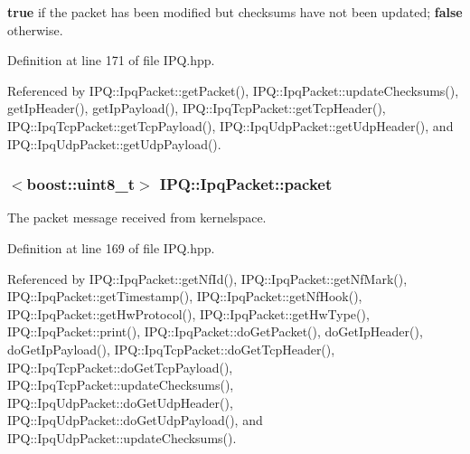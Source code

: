 {\bfseries true} if the packet has been modified but checksums have not been updated; {\bfseries false} otherwise. 



\-Definition at line 171 of file \-I\-P\-Q.\-hpp.



\-Referenced by \-I\-P\-Q\-::\-Ipq\-Packet\-::get\-Packet(), \-I\-P\-Q\-::\-Ipq\-Packet\-::update\-Checksums(), get\-Ip\-Header(), get\-Ip\-Payload(), \-I\-P\-Q\-::\-Ipq\-Tcp\-Packet\-::get\-Tcp\-Header(), \-I\-P\-Q\-::\-Ipq\-Tcp\-Packet\-::get\-Tcp\-Payload(), \-I\-P\-Q\-::\-Ipq\-Udp\-Packet\-::get\-Udp\-Header(), and \-I\-P\-Q\-::\-Ipq\-Udp\-Packet\-::get\-Udp\-Payload().

\hypertarget{classIPQ_1_1IpqPacket_a2bdf247f13a3e9f86e9e3846e6a9cb45}{
\subsubsection[{packet}]{$<$boost\-::uint8\-\_\-t$>$ {\bf \-I\-P\-Q\-::\-Ipq\-Packet\-::packet}}}
\label{classIPQ_1_1IpqPacket_a2bdf247f13a3e9f86e9e3846e6a9cb45}


\-The packet message received from kernelspace. 



\-Definition at line 169 of file \-I\-P\-Q.\-hpp.



\-Referenced by \-I\-P\-Q\-::\-Ipq\-Packet\-::get\-Nf\-Id(), \-I\-P\-Q\-::\-Ipq\-Packet\-::get\-Nf\-Mark(), \-I\-P\-Q\-::\-Ipq\-Packet\-::get\-Timestamp(), \-I\-P\-Q\-::\-Ipq\-Packet\-::get\-Nf\-Hook(), \-I\-P\-Q\-::\-Ipq\-Packet\-::get\-Hw\-Protocol(), \-I\-P\-Q\-::\-Ipq\-Packet\-::get\-Hw\-Type(), \-I\-P\-Q\-::\-Ipq\-Packet\-::print(), \-I\-P\-Q\-::\-Ipq\-Packet\-::do\-Get\-Packet(), do\-Get\-Ip\-Header(), do\-Get\-Ip\-Payload(), \-I\-P\-Q\-::\-Ipq\-Tcp\-Packet\-::do\-Get\-Tcp\-Header(), \-I\-P\-Q\-::\-Ipq\-Tcp\-Packet\-::do\-Get\-Tcp\-Payload(), \-I\-P\-Q\-::\-Ipq\-Tcp\-Packet\-::update\-Checksums(), \-I\-P\-Q\-::\-Ipq\-Udp\-Packet\-::do\-Get\-Udp\-Header(), \-I\-P\-Q\-::\-Ipq\-Udp\-Packet\-::do\-Get\-Udp\-Payload(), and \-I\-P\-Q\-::\-Ipq\-Udp\-Packet\-::update\-Checksums().

